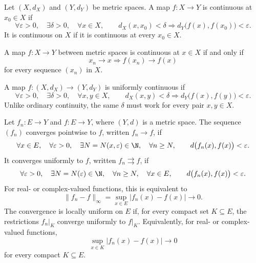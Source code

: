     \begin{definition}
        Let $(X,d_X)$ and $(Y,d_Y)$ be metric spaces. A map $f\colon X\to Y$ is
        continuous at $x_0\in X$ if
        \[
            \forall\varepsilon>0,
            \quad
            \exists\delta>0,
            \quad
            \forall x\in X,
            \qquad
            d_X(x,x_0)<\delta
            \Rightarrow
            d_Y\bigl(f(x),f(x_0)\bigr)<\varepsilon.
        \]
        It is continuous on $X$ if it is continuous at every $x_0\in X$.
    \end{definition}

    \begin{theorem}
        A map $f\colon X\to Y$ between metric spaces is continuous at $x\in X$ if
        and only if
        \[
            x_n\to x
            \Rightarrow
            f(x_n)\to f(x)
        \]
        for every sequence $(x_n)$ in $X$.
    \end{theorem}

    \begin{definition}
        A map $f\colon (X,d_X)\to(Y,d_Y)$ is uniformly continuous if
        \[
            \forall\varepsilon>0,
            \quad
            \exists\delta>0,
            \quad
            \forall x,y\in X,
            \qquad
            d_X(x,y)<\delta
            \Rightarrow
            d_Y\bigl(f(x),f(y)\bigr)<\varepsilon.
        \]
        Unlike ordinary continuity, the same $\delta$ must work for every pair
        $x,y\in X$.
    \end{definition}

    \begin{definition}
        Let $f_n\colon E\to Y$ and $f\colon E\to Y$, where $(Y,d)$ is a metric space. The
        sequence $(f_n)$ converges pointwise to $f$, written
        $f_n\to f$, if
        \[
            \forall x\in E,
            \quad
            \forall\varepsilon>0,
            \quad
            \exists N=N(x,\varepsilon)\in\N,
            \quad
            \forall n\geq N,
            \qquad
            d\bigl(f_n(x),f(x)\bigr)<\varepsilon.
        \]
        It converges uniformly to $f$, written $f_n\rightrightarrows f$, if
        \[
            \forall\varepsilon>0,
            \quad
            \exists N=N(\varepsilon)\in\N,
            \quad
            \forall n\geq N,
            \quad
            \forall x\in E,
            \qquad
            d\bigl(f_n(x),f(x)\bigr)<\varepsilon.
        \]
        For real- or complex-valued functions, this is equivalent to
        \[
            \|f_n-f\|_\infty
            =
            \sup_{x\in E}|f_n(x)-f(x)|
            \longrightarrow 0.
        \]
        The convergence is locally uniform on $E$ if, for every compact set
        $K\subseteq E$, the restrictions $f_n|_K$ converge uniformly to $f|_K$.
        Equivalently, for real- or complex-valued functions,
        \[
            \sup_{x\in K}|f_n(x)-f(x)|
            \longrightarrow 0
        \]
        for every compact $K\subseteq E$.
    \end{definition}

